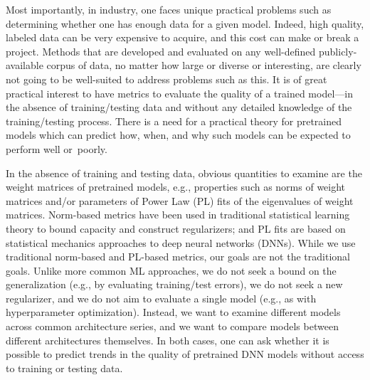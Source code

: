 Most importantly, in industry, one faces unique practical problems such as determining whether one has enough data for a given model. 
Indeed, high quality, labeled data can be very expensive to acquire, and this cost can make or break a project.
Methods that are developed and evaluated on any well-defined publicly-available corpus of data, no matter how large or diverse or interesting, are clearly not going to be well-suited to address problems such as this.
It is of great practical interest to have metrics to evaluate the quality of a trained model---in the absence of training/testing data and without any detailed knowledge of the training/testing process.  
There is a need for a practical theory for pretrained models which can predict how, when, and why such models can be expected to perform well or~poorly.

In the absence of training and testing data, obvious quantities to examine are the weight matrices of pretrained models, e.g., 
properties such as norms of weight matrices and/or parameters of Power Law (PL) fits of the eigenvalues of weight matrices.
Norm-based metrics have been used in traditional statistical learning theory to bound capacity and construct regularizers; and PL fits are based on statistical mechanics approaches to deep neural networks (DNNs).
While we use traditional norm-based and PL-based metrics, our goals are not the traditional goals.
Unlike more common ML approaches, we do not seek a bound on the generalization (e.g., by evaluating training/test errors), we do not seek a new regularizer, and we do not aim to evaluate a single model (e.g., as with hyperparameter optimization).
Instead, we want to examine different models across common architecture series, and we want to compare models between different architectures themselves.
In both cases, one can ask whether it is possible to predict trends in the quality of pretrained DNN models without access to training or testing data.  

